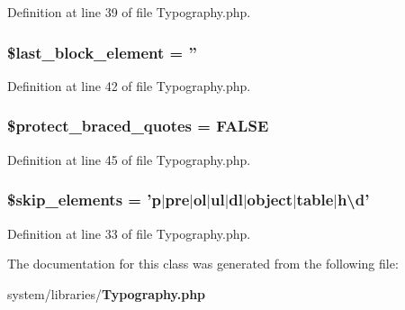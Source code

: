 Definition at line 39 of file Typography.\-php.

\subsubsection[{\$last\-\_\-block\-\_\-element}]{\setlength{\rightskip}{0pt plus 5cm}\$last\-\_\-block\-\_\-element = ''}\label{class_c_i___typography_a8d5c4b7f2f7b74e118c682cf95688e22}


Definition at line 42 of file Typography.\-php.

\subsubsection[{\$protect\-\_\-braced\-\_\-quotes}]{\setlength{\rightskip}{0pt plus 5cm}\$protect\-\_\-braced\-\_\-quotes = F\-A\-L\-S\-E}\label{class_c_i___typography_a6a74364571da23cc7187c864cde167ca}


Definition at line 45 of file Typography.\-php.

\subsubsection[{\$skip\-\_\-elements}]{\setlength{\rightskip}{0pt plus 5cm}\$skip\-\_\-elements = '{\bf p}$|$pre$|$ol$|$ul$|$dl$|$object$|$table$|$h\textbackslash{}d'}\label{class_c_i___typography_a80c70a349bff88ad1ef94dea8753bc2e}


Definition at line 33 of file Typography.\-php.



The documentation for this class was generated from the following file\-:\begin{DoxyCompactItemize}
\item 
system/libraries/{\bf Typography.\-php}\end{DoxyCompactItemize}
